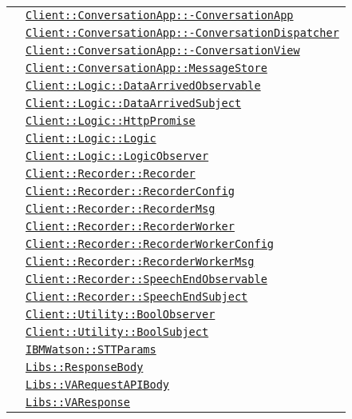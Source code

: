 \begin{longtable}{|>{\centering}m{3cm}|m{10cm}<{\centering}|}
& \hyperref[Client::ConversationApp::ConversationApp]{\texttt{Client::ConversationApp::-\linebreak ConversationApp}}\\
& \hyperref[Client::ConversationApp::ConversationDispatcher]{\texttt{Client::ConversationApp::-\linebreak ConversationDispatcher}}\\
& \hyperref[Client::ConversationApp::ConversationView]{\texttt{Client::ConversationApp::-\linebreak ConversationView}}\\
& \hyperref[Client::ConversationApp::MessageStore]{\texttt{Client::ConversationApp::MessageStore}}\\
& \hyperref[Client::Logic::DataArrivedObservable]{\texttt{Client::Logic::DataArrivedObservable}}\\
& \hyperref[Client::Logic::DataArrivedSubject]{\texttt{Client::Logic::DataArrivedSubject}}\\
& \hyperref[Client::Logic::HttpPromise]{\texttt{Client::Logic::HttpPromise}}\\
& \hyperref[Client::Logic::Logic]{\texttt{Client::Logic::Logic}}\\
& \hyperref[Client::Logic::LogicObserver]{\texttt{Client::Logic::LogicObserver}}\\
& \hyperref[Client::Recorder::Recorder]{\texttt{Client::Recorder::Recorder}}\\
& \hyperref[Client::Recorder::RecorderConfig]{\texttt{Client::Recorder::RecorderConfig}}\\
& \hyperref[Client::Recorder::RecorderMsg]{\texttt{Client::Recorder::RecorderMsg}}\\
& \hyperref[Client::Recorder::RecorderWorker]{\texttt{Client::Recorder::RecorderWorker}}\\
& \hyperref[Client::Recorder::RecorderWorkerConfig]{\texttt{Client::Recorder::RecorderWorkerConfig}}\\
& \hyperref[Client::Recorder::RecorderWorkerMsg]{\texttt{Client::Recorder::RecorderWorkerMsg}}\\
& \hyperref[Client::Recorder::SpeechEndObservable]{\texttt{Client::Recorder::SpeechEndObservable}}\\
& \hyperref[Client::Recorder::SpeechEndSubject]{\texttt{Client::Recorder::SpeechEndSubject}}\\
& \hyperref[Client::Utility::BoolObserver]{\texttt{Client::Utility::BoolObserver}}\\
& \hyperref[Client::Utility::BoolSubject]{\texttt{Client::Utility::BoolSubject}}\\
& \hyperref[IBMWatson::STTParams]{\texttt{IBMWatson::STTParams}}\\
& \hyperref[Libs::ResponseBody]{\texttt{Libs::ResponseBody}}\\
& \hyperref[Libs::VARequestAPIBody]{\texttt{Libs::VARequestAPIBody}}\\
& \hyperref[Libs::VAResponse]{\texttt{Libs::VAResponse}}\\ \hline


\end{longtable}
